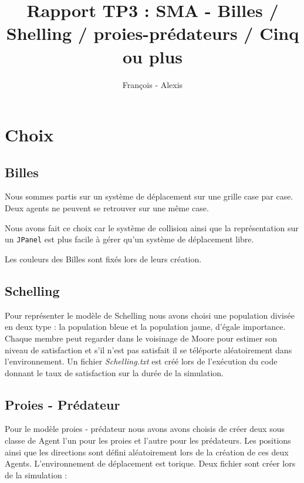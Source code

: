 \documentclass[a4paper,10pt]{article}
\title{Rapport TP3 : SMA - Billes / Shelling / proies-pr\'edateurs / Cinq ou plus}
\author{Fran\c{c}ois \bsc{Lepan} - Alexis \bsc{Linke}}
\begin{document}
\maketitle

\section{Choix}

\subsection{Billes}
Nous sommes partis sur un syst\`eme de d\'eplacement sur une grille case par case. Deux agents ne peuvent  se retrouver sur une m\^eme case.

Nous avons fait ce choix car le syst\`eme de collision ainsi que la repr\'esentation sur un \verb&JPanel& est plus facile \`a g\'erer qu'un syst\`eme de d\'eplacement libre.

Les couleurs des Billes sont fix\'es lors de leurs cr\'eation. \\

\subsection{Schelling}

Pour repr\'esenter le mod\`ele de Schelling nous avons choisi une population divis\'ee en deux type : la population bleue et la population jaune, d'\'egale importance. Chaque membre peut regarder dans le voisinage de Moore pour estimer son niveau de satisfaction et s'il n'est pas satisfait il se t\'el\'eporte al\'eatoirement dans l'environnement. Un fichier \emph{Schelling.txt} est cr\'e\'e lors de l'ex\'ecution du code donnant le taux de satisfaction sur la dur\'ee de la simulation. \\

\subsection{Proies - Pr\'edateur}

Pour le mod\`ele proies - pr\'edateur nous avons avons choisis de cr\'eer deux sous classe de Agent l'un pour les proies et l'autre pour les pr\'edateurs. Les positions ainsi que les directions sont d\'efini al\'eatoirement lors de la cr\'eation de ces deux Agents. L'environnement de d\'eplacement est torique.
Deux fichier sont cr\'eer lors de la simulation : \\
\end{document}
